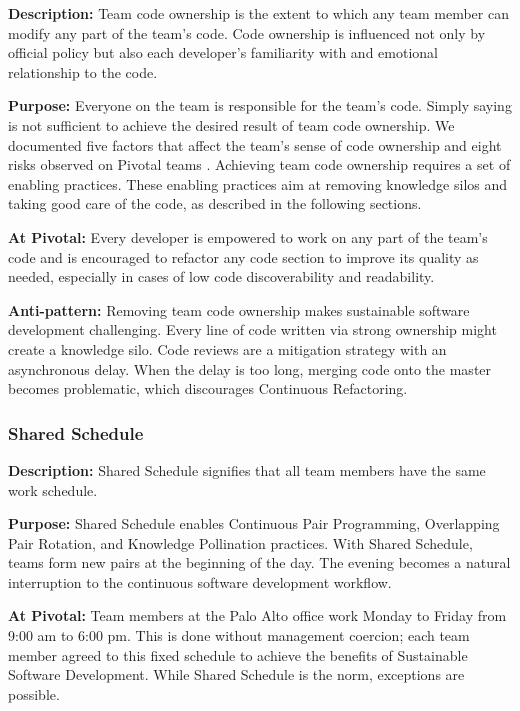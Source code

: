 \textbf{Description:} Team code ownership is the extent to which any team member can modify any part of the team's code. Code ownership is influenced not only by official policy but also each developer's familiarity with and emotional relationship to the code.

\textbf{Purpose:} Everyone on the team is responsible for the team's code. Simply saying  is not sufficient to achieve the desired result of team code ownership. We documented five factors that affect the team's sense of code ownership and eight risks observed on Pivotal teams \cite{SedanoTeamCodeOwnership}. Achieving team code ownership requires a set of enabling practices. These enabling practices aim at removing knowledge silos and taking good care of the code, as described in the following sections.

\textbf{At Pivotal:} Every developer is empowered to work on any part of the team's code and is encouraged to refactor any code section to improve its quality as needed, especially in cases of low code discoverability and readability.

\textbf{Anti-pattern:} Removing team code ownership makes sustainable software development challenging. Every line of code written via strong ownership might create a knowledge silo. Code reviews are a mitigation strategy with an asynchronous delay. When the delay is too long, merging code onto the master becomes problematic, which discourages Continuous Refactoring. 

\subsubsection{Shared Schedule}
\textbf{Description:} Shared Schedule signifies that all team members have the same work schedule. 

\textbf{Purpose:} Shared Schedule enables Continuous Pair Programming, Overlapping Pair Rotation, and Knowledge Pollination practices. With Shared Schedule, teams form new pairs at the beginning of the day. The evening becomes a natural interruption to the continuous software development workflow. 

\textbf{At Pivotal:} Team members at the Palo Alto office work Monday to Friday from 9:00 am to 6:00 pm. This is done without management coercion; each team member agreed to this fixed schedule to achieve the benefits of Sustainable Software Development. While Shared Schedule is the norm, exceptions are possible. 

